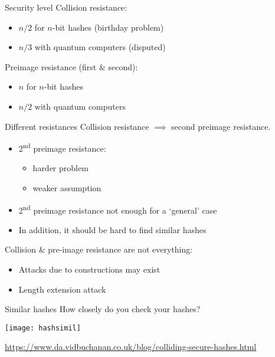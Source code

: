 \begin{frame}{Security level}
  Collision resistance:
  \begin{itemize}[<+(1)->]
    \item $n/2$ for $n$-bit hashes (birthday problem)
    \item $n/3$ with quantum computers (disputed)
  \end{itemize}

  \vspace*{1em}

  \pause
  Preimage resistance (first \& second):
  \begin{itemize}[<+(1)->]
    \item $n$ for $n$-bit hashes
    \item $n/2$ with quantum computers
  \end{itemize}
\end{frame}

\begin{frame}{Different resistances}
  Collision resistance $\implies$ second preimage resistance.
  \begin{itemize}[<+(1)->]
    \item 2\textsuperscript{nd} preimage resistance:
    \begin{itemize}
      \item harder problem
      \item weaker assumption
    \end{itemize}
    \item 2\textsuperscript{nd} preimage resistance not enough for a `general' case
    \item In addition, it should be hard to find similar hashes
  \end{itemize}

  \vspace*{1em}

  \pause
  Collision \& pre-image resistance are not everything:
  \begin{itemize}[<+(1)->]
    \item Attacks due to constructions may exist
    \item Length extension attack
  \end{itemize}
\end{frame}

\begin{frame}{Similar hashes}
  \pause
  How closely do you check your hashes?
  \begin{center}
    \texttt{[image: hashsimil]}
  \end{center}
  \vfill
  {\scriptsize\url{https://www.da.vidbuchanan.co.uk/blog/colliding-secure-hashes.html}}
\end{frame}

